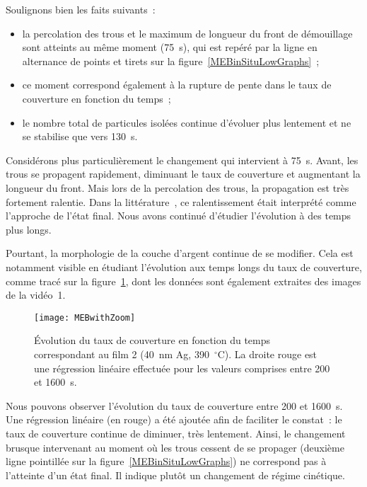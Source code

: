 Soulignons bien les faits suivants~:
\begin{itemize}
\item la percolation des trous et le maximum de longueur du front de démouillage sont atteints au même moment (75~s), qui est repéré par la ligne en alternance de points et tirets sur la figure~\ref{MEBinSituLowGraphs}~;
\item ce moment correspond également à la rupture de pente dans le taux de couverture en fonction du temps~;
\item le nombre total de particules isolées continue d'évoluer plus lentement et ne se stabilise que vers 130~s.
\end{itemize}
Considérons plus particulièrement le changement qui intervient à 75~s. Avant, les trous se propagent rapidement, diminuant le taux de couverture et augmentant la longueur du front. Mais lors de la percolation des trous, la propagation est très fortement ralentie. Dans la littérature~\cite{presland1972hillock}, ce ralentissement était interprété comme l'approche de l'état final. Nous avons continué d'étudier l'évolution à des temps plus longs.\par 
Pourtant, la morphologie de la couche d'argent continue de se modifier. Cela est notamment visible en étudiant l'évolution aux temps longs du taux de couverture, comme tracé sur la figure~\ref{MEBzoom}, dont les données sont également extraites des images de la vidéo~1.

\begin{figure}[h]
	\centering
	\texttt{[image: MEBwithZoom]}
	\caption{\'Evolution du taux de couverture en fonction du temps correspondant au film 2 (40~nm Ag, 390~$^\circ$C). La droite rouge est une régression linéaire effectuée pour les valeurs comprises entre 200 et 1600~s.}
	\label{MEBzoom}
\end{figure}

Nous pouvons observer l'évolution du taux de couverture entre 200 et 1600~s. Une régression linéaire (en rouge) a été ajoutée afin de faciliter le constat~: le taux de couverture continue de diminuer, très lentement. Ainsi, le changement brusque intervenant au moment où les trous cessent de se propager (deuxième ligne pointillée sur la figure~\ref{MEBinSituLowGraphs}) ne correspond pas à l'atteinte d'un état final. Il indique plutôt un changement de régime cinétique.



